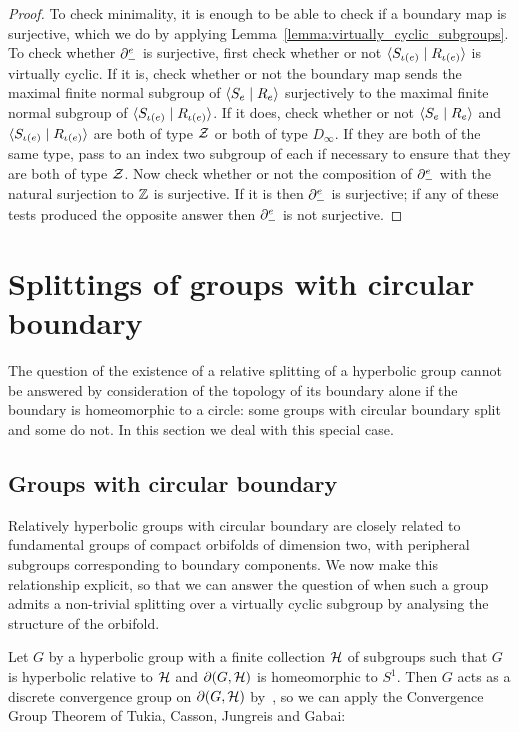 \begin{proof}
To check minimality, it is enough to be able to check if a boundary map is surjective, which we do by applying Lemma~\ref{lemma:virtually_cyclic_subgroups}.
To check whether $\partial^e_{-}$ is surjective, first check whether or not $\langle S_{\operatorname{\iota}(e)} \mid R_{\operatorname{\iota}(e)}\rangle$ is virtually cyclic.
If it is, check whether or not the boundary map sends the maximal finite normal subgroup of $\langle S_e \mid R_e\rangle$ surjectively to the maximal finite normal subgroup of $\langle S_{\operatorname{\iota}(e)} \mid R_{\operatorname{\iota}(e)}\rangle$.
If it does, check whether or not $\langle S_e \mid R_e\rangle$ and $\langle S_{\operatorname{\iota}(e)} \mid R_{\operatorname{\iota}(e)}\rangle$ are both of type $\mathcal{Z}$ or both of type $D_\infty$.
If they are both of the same type, pass to an index two subgroup of each if necessary to ensure that they are both of type $\mathcal{Z}$.
Now check whether or not the composition of $\partial^e_{-}$ with the natural surjection to $\mathbb{Z}$ is surjective.
If it is then $\partial^e_{-}$ is surjective; if any of these tests produced the opposite answer then $\partial^e_{-}$ is not surjective.
\end{proof}

\section{Splittings of groups with circular boundary}\label{section:fuchsian_groups}

The question of the existence of a relative splitting of a hyperbolic group cannot be answered by consideration of the topology of its boundary alone if the boundary is homeomorphic to a circle: some groups with circular boundary split and some do not. 
In this section we deal with this special case. 

\subsection{Groups with circular boundary}\label{section:convergence_group_theorem}

Relatively hyperbolic groups with circular boundary are closely related to fundamental groups of compact orbifolds of dimension two, with peripheral subgroups corresponding to boundary components.
We now make this relationship explicit, so that we can answer the question of when such a group admits a non-trivial splitting over a virtually cyclic subgroup by analysing the structure of the orbifold.

Let $G$ by a hyperbolic group with a finite collection $\mathcal{H}$ of subgroups such that $G$ is hyperbolic relative to $\mathcal{H}$ and $\partial(G, \mathcal{H})$ is homeomorphic to $S^1$. 
Then $G$ acts as a discrete convergence group on $\partial(G, \mathcal{H})$ by~\cite{bowditch99c}, so we can apply the Convergence Group Theorem of Tukia, Casson, Jungreis and Gabai:

